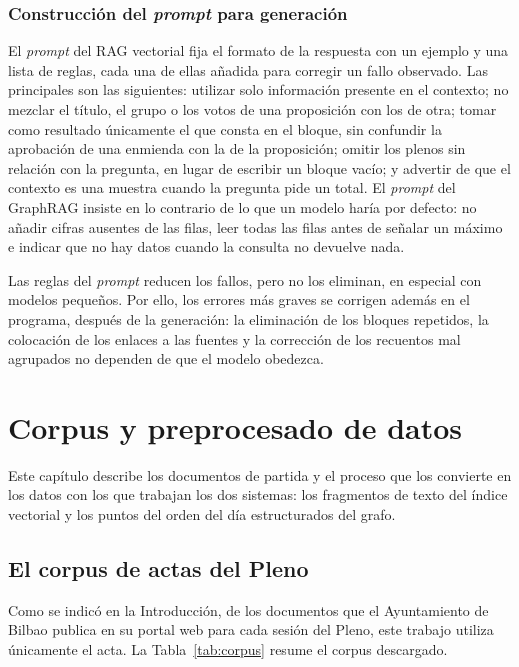 \documentclass[11pt, a4paper]{report}
\begin{document}
	\subsection{Construcción del \textit{prompt} para generación}

	El \textit{prompt} del RAG vectorial fija el formato de la respuesta con un
	ejemplo y una lista de reglas, cada una de ellas añadida para corregir un
	fallo observado. Las principales son las siguientes: utilizar solo información
	presente en el contexto; no mezclar el título, el grupo o los votos de una
	proposición con los de otra; tomar como resultado únicamente el que consta en
	el bloque, sin confundir la aprobación de una enmienda con la de la
	proposición; omitir los plenos sin relación con la pregunta, en lugar de
	escribir un bloque vacío; y advertir de que el contexto es una muestra cuando
	la pregunta pide un total. El \textit{prompt} del GraphRAG insiste en lo
	contrario de lo que un modelo haría por defecto: no añadir cifras ausentes de
	las filas, leer todas las filas antes de señalar un máximo e indicar que no
	hay datos cuando la consulta no devuelve nada.

	Las reglas del \textit{prompt} reducen los fallos, pero no los eliminan, en especial con modelos pequeños. Por ello, los errores más graves se corrigen además
	en el programa, después de la generación: la eliminación de los bloques
	repetidos, la colocación de los enlaces a las fuentes y la corrección de los
	recuentos mal agrupados no dependen de que el modelo obedezca.

	\chapter{Corpus y preprocesado de datos}
	\label{ch:corpus}

	Este capítulo describe los documentos de partida y el proceso que los
	convierte en los datos con los que trabajan los dos sistemas: los fragmentos
	de texto del índice vectorial y los puntos del orden del día estructurados del
	grafo.

	\section{El corpus de actas del Pleno}

	Como se indicó en la Introducción, de los documentos que el Ayuntamiento de
	Bilbao publica en su portal web para cada sesión del Pleno, este trabajo
	utiliza únicamente el acta. La Tabla~\ref{tab:corpus} resume el corpus
	descargado.
\end{document}
